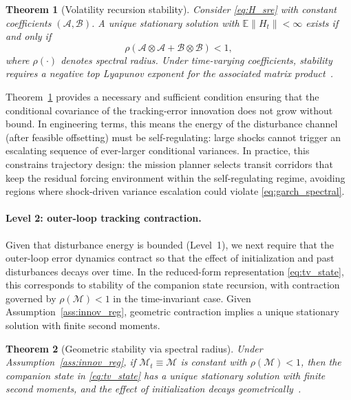\documentclass{article}
\newtheorem{theorem}{Theorem}
\begin{document}
\begin{theorem}[Volatility recursion stability]
\label{thm:garch_stability}
Consider \eqref{eq:H_sre} with constant coefficients $(\mathcal{A},\mathcal{B})$. A unique stationary solution with $\mathbb{E}\|H_t\|<\infty$ exists if and only if
\begin{equation}
\rho(\mathcal{A}\otimes\mathcal{A}+\mathcal{B}\otimes\mathcal{B})<1,
\label{eq:garch_spectral}
\end{equation}
where $\rho(\cdot)$ denotes spectral radius. Under time-varying coefficients, stability requires a negative top Lyapunov exponent for the associated matrix product~\cite{bougerol1992strict,straumann2006quasi}.
\end{theorem}

Theorem~\ref{thm:garch_stability} provides a necessary and sufficient condition ensuring that the conditional covariance of the tracking-error innovation does not grow without bound. In engineering terms, this means the energy of the disturbance channel (after feasible offsetting) must be self-regulating: large shocks cannot trigger an escalating sequence of ever-larger conditional variances. In practice, this constrains trajectory design: the mission planner selects transit corridors that keep the residual forcing environment within the self-regulating regime, avoiding regions where shock-driven variance escalation could violate \eqref{eq:garch_spectral}.

\paragraph{Level 2: outer-loop tracking contraction.}
Given that disturbance energy is bounded (Level~1), we next require that the outer-loop error dynamics contract so that the effect of initialization and past disturbances decays over time. In the reduced-form representation \eqref{eq:tv_state}, this corresponds to stability of the companion state recursion, with contraction governed by $\rho(\mathcal{M})<1$ in the time-invariant case. Given Assumption~\ref{ass:innov_reg}, geometric contraction implies a unique stationary solution with finite second moments.

\begin{theorem}[Geometric stability via spectral radius]
\label{thm:tracking_stability}
Under Assumption~\ref{ass:innov_reg}, if $\mathcal{M}_t\equiv\mathcal{M}$ is constant with $\rho(\mathcal{M})<1$, then the companion state in \eqref{eq:tv_state} has a unique stationary solution with finite second moments, and the effect of initialization decays geometrically~\cite{hamilton1994,lutkepohl2005,andree2020dynamic}.
\end{theorem}
\end{document}
